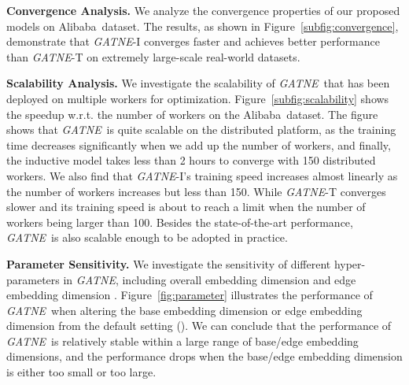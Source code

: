 \documentclass[sigconf]{acmart}
\newcommand{\company}{Alibaba}
\newcommand{\model}{{\em GATNE}}
\newcommand{\hide}[1]{} \newcommand{\jie}[1]{\textbf{\color{red}[(JT: #1 )]}}  \newcommand{\vpara}[1]{\vspace{0.07in}\noindent\textbf{#1 }}
\begin{document}
\vpara{Convergence Analysis.}
We analyze the convergence properties of our proposed models on \company\ dataset. \hide{For detailed implementations see Appendix \ref{app:converge}.} The results, as shown in Figure~\ref{subfig:convergence}, demonstrate that \model-I converges faster and achieves better performance than \model-T on extremely large-scale real-world datasets. 

\vpara{Scalability Analysis.}
We investigate the scalability of \model\ that has been deployed on multiple workers for optimization. Figure~\ref{subfig:scalability} shows the speedup w.r.t. the number of workers on the \company\ dataset. The figure shows that \model\ is quite scalable on the distributed platform, as the training time decreases significantly when we add up the number of workers, and finally, the inductive model takes less than 2 hours to converge with 150 distributed workers. We also find that \model-I's training speed increases almost linearly as the number of workers increases but less than 150. While  \model-T converges slower and its training speed is about to reach a limit when the number of workers being larger than 100. Besides the state-of-the-art performance, \model\ is also scalable enough to be adopted in practice. 
\iffalse
We investigate the scalability of \model\ which are deployed on multiple workers for optimization. Figure~\ref{subfig:scalability} shows the speed up w.r.t. the number of workers on the \company\ dataset. The figure shows that our proposed models are quite scalable on the distributed platform, as the training time decreases significantly when we add up number of workers, and finally the inductive model takes less than 2 hours to converge when using 150 distributed workers. We summarize that besides state-of-the-art performance, our model is scalable enough to be adopted in practice. 
\fi



\vpara{Parameter Sensitivity.}
We investigate the sensitivity of different hyper-parameters in \model, including overall embedding dimension  and edge embedding dimension .\hide{, and also the sensitivity to sparse input. In real world scenarios, usually is takes a hard effort to get full link information of graphs, but not that hard to collect some of the link information. So we also evaluate \model's performance when the link of the training graph not being provided. } Figure~\ref{fig:parameter} illustrates the performance of \model\ when altering the base embedding dimension  or edge embedding dimension  from the default setting (). We can conclude that the performance of \model\ is relatively stable within a large range of base/edge embedding dimensions, and the performance drops when the base/edge embedding dimension is either too small or too large. \hide{For the implementation details see the Appendix \ref{app:para}.}
\end{document}
